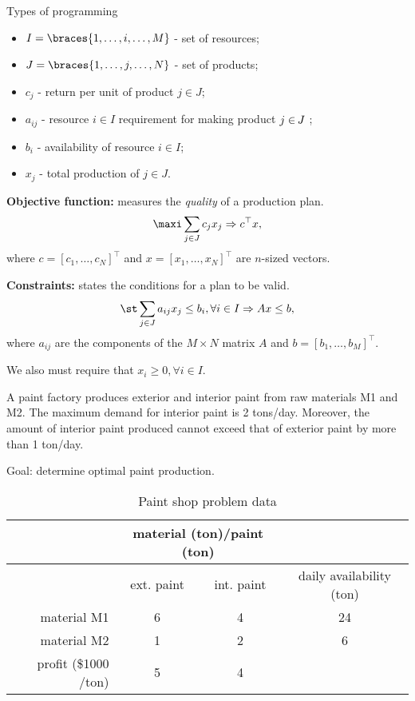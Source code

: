 \begin{frame}{Types of programming}
\begin{itemize}
	\item {\small $I = \braces{1, \dots, i, \dots, M}$}  - set of resources; 
	\item {\small $J = \braces{1, \dots, j, \dots, N}$} - set of products;
	\item $c_j$ - return per unit of product $j\in J$;
	\item $a_{ij}$ - resource $i\in I$ requirement for making product $j\in\hspace{-1pt} J$ ;
	\item $b_i$ - availability of resource $i\in I$; 
	\item $x_j$ - total production of $j \in J$.
\end{itemize}


{\bf Objective function:} measures the \emph{quality} of a production plan.
\begin{equation*}
	\maxi \sum_{j \in J}c_jx_j \Rightarrow c^\top x,
\end{equation*}
where $c = [c_1, \dots, c_{N}]^\top$ \hspace{-4pt} and $x = [x_1, \dots, x_{N}]^\top$ \hspace{-4pt} are $n$-sized vectors.


{\bf Constraints:} states the conditions for a plan to be \alert{valid}.
\begin{equation*}
	\st \sum_{j \in J} a_{ij}x_j \leq b_i, \forall i \in I	\Rightarrow	Ax \leq b,
\end{equation*}
where $a_{ij}$ are the components of the $M \times N$ matrix $A$ and $b = [b_1,\dots, b_M]^\top$. 

We also must require that $x_i \geq 0, \forall i \in I$.                                                                                                         


A paint factory produces \alert{exterior} and \alert{interior paint} from raw materials \alert{M1} and \alert{M2}. The \alert{maximum demand} for interior paint is 2 tons/day. Moreover, the amount of interior paint produced \alert{cannot exceed} that of exterior paint by more than 1 ton/day. 

\alert{Goal:} determine optimal paint production.
%

\begin{table}
	\begin{tabular}{rccc} \hline
	&\multicolumn{2}{c}{material (ton)/paint (ton)}\\ \hline
	& ext. paint & int. paint & daily availability (ton)\\ \hline
	material M1 & 6 & 4 & 24\\
	material M2 & 1 & 2 & 6\\ \hline
	profit (\$1000 /ton) & 5 & 4\\ \hline
	\end{tabular}
	\caption{Paint shop problem data} 
\end{table}



\end{frame}
